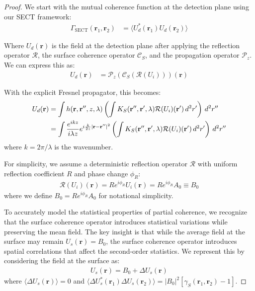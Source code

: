 \documentclass[10pt,a4paper]{amsart}
\begin{document}
\begin{proof}
We start with the mutual coherence function at the detection plane using our SECT framework:
\begin{align}
\Gamma_{\text{SECT}}(\mathbf{r}_1, \mathbf{r}_2) &= \langle U_d^*(\mathbf{r}_1) U_d(\mathbf{r}_2) \rangle
\end{align}

Where $U_d(\mathbf{r})$ is the field at the detection plane after applying the reflection operator $\mathcal{R}$, the surface coherence operator $\mathcal{C}_S$, and the propagation operator $\mathcal{P}_z$. We can express this as:
\begin{align}
U_d(\mathbf{r}) &= \mathcal{P}_z(\mathcal{C}_S(\mathcal{R}(U_i)))(\mathbf{r})
\end{align}

With the explicit Fresnel propagator, this becomes:
\begin{align}
U_d(\mathbf{r}) &= \int h(\mathbf{r}, \mathbf{r}'', z, \lambda) \left( \int K_S(\mathbf{r}'', \mathbf{r}', \lambda) \mathcal{R}(U_i)(\mathbf{r}') \, d^2r' \right) \, d^2r'' \\
&= \int \frac{e^{ikz}}{i\lambda z} e^{i\frac{k}{2z}|\mathbf{r} - \mathbf{r}''|^2} \left( \int K_S(\mathbf{r}'', \mathbf{r}', \lambda) \mathcal{R}(U_i)(\mathbf{r}') \, d^2r' \right) \, d^2r'' \notag
\end{align}
where $k = 2\pi/\lambda$ is the wavenumber.

For simplicity, we assume a deterministic reflection operator $\mathcal{R}$ with uniform reflection coefficient $R$ and phase change $\phi_R$:
\begin{align}
\mathcal{R}(U_i)(\mathbf{r}) = R e^{i\phi_R} U_i(\mathbf{r}) = R e^{i\phi_R} A_0 \equiv B_0
\end{align}
where we define $B_0 = R e^{i\phi_R} A_0$ for notational simplicity.

To accurately model the statistical properties of partial coherence, we recognize that the surface coherence operator introduces statistical variations while preserving the mean field. The key insight is that while the average field at the surface may remain $U_s(\mathbf{r}) = B_0$, the surface coherence operator introduces spatial correlations that affect the second-order statistics. We represent this by considering the field at the surface as:
\begin{align}
U_s(\mathbf{r}) = B_0 + \Delta U_s(\mathbf{r})
\end{align}
where $\langle \Delta U_s(\mathbf{r}) \rangle = 0$ and $\langle \Delta U_s^*(\mathbf{r}_1) \Delta U_s(\mathbf{r}_2) \rangle = |B_0|^2 [\gamma_S(\mathbf{r}_1, \mathbf{r}_2) - 1]$.


\end{proof}
\end{document}
